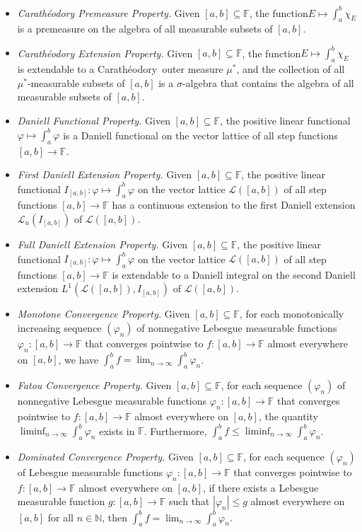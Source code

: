 \documentclass[10pt,a4paper]{amsart}
\def\DCP{\ensuremath{{\bf(DCP_{A})}}}
\def\CEP{\ensuremath{{\bf(CEP)}}}
\def\iDEP{\ensuremath{{\bf(DEP1)}}}
\def\iiDEP{\ensuremath{{\bf(DEP2)}}}
\def\F{\mathbb{F}}
\def\N{\mathbb{N}}
\def\MCP{\ensuremath{{\bf(MCP)}}}
\def\FCP{\ensuremath{{\bf(FCP)}}}
\def\DCP{\ensuremath{{\bf(DCP)}}}
\def\DFP{\ensuremath{{\bf(DFP)}}}
\def\CPP{\ensuremath{{\bf(CPP)}}}
\def\lbrak{\left[}
\def\rbrak{\right]}
\def\abClosed{\lbrak a,b\rbrak}
\def\stepLatt{\mathcal{L}}
\def\istepLatt{\stepLatt_u}
\def\into{\longrightarrow}
\def\sub{\subseteq}
\def\nseqlim{{\displaystyle\lim_{n\rightarrow\infty}}}
\def\nseqliminf{{\displaystyle\liminf_{n\rightarrow\infty}}}
\def\Cara{Carath\'{e}odory\  }
\begin{document}
\begin{itemize}
\item[\CPP] \emph{Carath\'{e}odory Premeasure Property.} Given $\abClosed\sub\F$, the function\linebreak $E\mapsto\int_a^b\chi_E$ is a premeasure on the algebra of all measurable subsets of $\abClosed$.
    \item[\CEP]\emph{Carath\'{e}odory Extension Property.} Given $\abClosed\sub\F$, the function\linebreak $E\mapsto\int_a^b\chi_E$ is extendable to a \Cara outer measure $\mu^*$, and the collection of all $\mu^*$-measurable subsets of $\abClosed$ is a $\sigma$-algebra that contains the algebra of all measurable subsets of $\abClosed$.
    \item[\DFP]\emph{Daniell Functional Property.} Given $\abClosed\sub\F$,  the positive linear functional $\varphi\mapsto\int_a^b\varphi$ is a Daniell functional on the vector lattice of all step functions $\abClosed\into\F$.
    \item[\iDEP]\emph{First Daniell Extension Property.} Given $\abClosed\sub\F$,  the positive linear functional $I_{\abClosed}:\varphi\mapsto\int_a^b\varphi$ on the vector lattice $\stepLatt(\abClosed)$ of all step functions $\abClosed\into\F$ has a continuous extension to the first Daniell extension $\istepLatt(I_{\abClosed})$ of $\stepLatt(\abClosed)$. 
\item[\iiDEP]\emph{Full Daniell Extension Property.} Given $\abClosed\sub\F$, the positive linear functional $I_{\abClosed}:\varphi\mapsto\int_a^b\varphi$ on the vector lattice $\stepLatt(\abClosed)$ of all step functions $\abClosed\into\F$ is extendable to a Daniell integral on the second Daniell extension $L^1(\stepLatt(\abClosed),I_{\abClosed})$ of $\stepLatt(\abClosed)$. 

    \item[\MCP]\emph{Monotone Convergence Property.} Given $\abClosed\sub\F$, for each monotonically increasing sequence $(\varphi_n)$ of nonnegative Lebesgue measurable functions $\varphi_n:\abClosed\into\F$ that converges pointwise to $f:\abClosed\into\F$ almost everywhere on $\abClosed$, we have $\int_a^bf=\nseqlim\int_a^b\varphi_n$.
    
    \item[\FCP]\emph{Fatou Convergence Property.} Given $\abClosed\sub\F$, for each sequence $(\varphi_n)$ of nonnegative Lebesgue measurable functions $\varphi_n:\abClosed\into\F$ that converges pointwise to $f:\abClosed\into\F$ almost everywhere on $\abClosed$, the quantity $\nseqliminf\int_a^b\varphi_n$ exists in $\F$. Furthermore, $\int_a^bf\leq\nseqliminf\int_a^b\varphi_n$.
    \item[\DCP]\emph{Dominated Convergence Property.} Given $\abClosed\sub\F$, for each sequence $(\varphi_n)$ of Lebesgue measurable functions $\varphi_n:\abClosed\into\F$ that converges pointwise to $f:\abClosed\into\F$ almost everywhere on $\abClosed$, if there exists a Lebesgue measurable function $g:\abClosed\into\F$ such that $|\varphi_n|\leq g$ almost everywhere on $\abClosed$ for all $n\in\N$, then $\int_a^bf=\nseqlim\int_a^b\varphi_n$.



\end{itemize}
\end{document}
